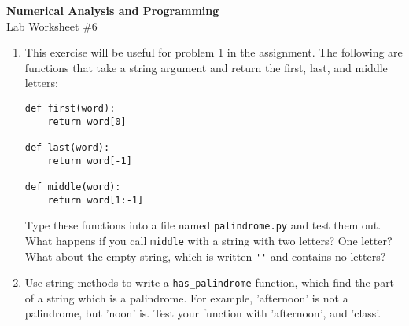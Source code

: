 \documentclass[12pt]{article}
\begin{document}
\begin{center}
\Large
\textbf{Numerical Analysis and Programming}\\
\large
Lab Worksheet \#6
\end{center}
\begin{enumerate}
\item This exercise will be useful for problem 1 in the assignment. The following are functions that take a string argument and
return the first, last, and middle letters:


\begin{verbatim}
def first(word):
    return word[0]

def last(word):
    return word[-1]

def middle(word):
    return word[1:-1]
\end{verbatim}


 Type these functions into a file named {\tt palindrome.py}
and test them out.  What happens if you call {\tt middle} with
a string with two letters?  One letter?  What about the empty
string, which is written \verb"''" and contains no letters?
\item Use string methods to write a \verb!has_palindrome! function, which find the part of a string which is a palindrome. For example, 'afternoon' is not a palindrome, but 'noon' is. Test your function with 'afternoon', and  'class'.   

\end{enumerate}
\end{document}
